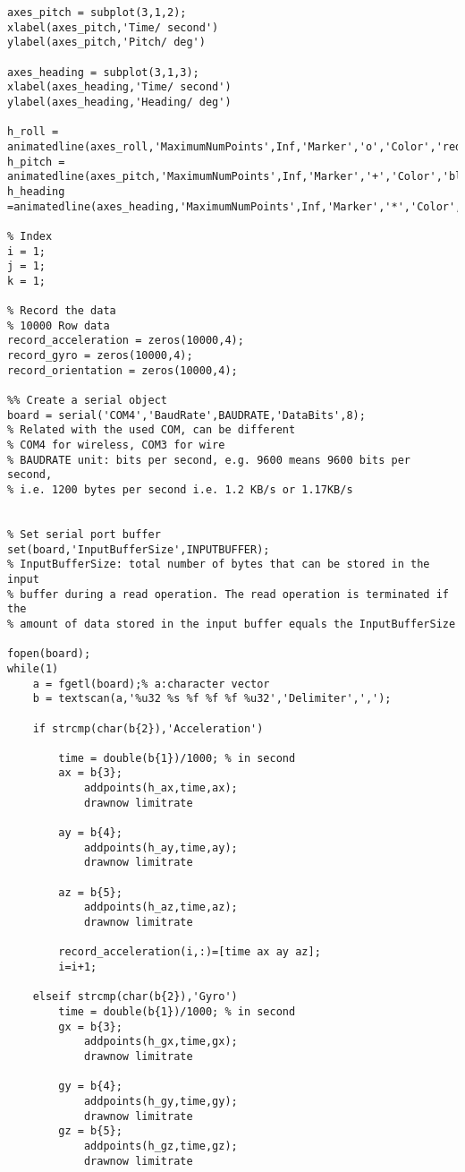 \begin{lstlisting}
axes_pitch = subplot(3,1,2);
xlabel(axes_pitch,'Time/ second')
ylabel(axes_pitch,'Pitch/ deg')

axes_heading = subplot(3,1,3);
xlabel(axes_heading,'Time/ second')
ylabel(axes_heading,'Heading/ deg')

h_roll = animatedline(axes_roll,'MaximumNumPoints',Inf,'Marker','o','Color','red');
h_pitch = animatedline(axes_pitch,'MaximumNumPoints',Inf,'Marker','+','Color','blue');
h_heading =animatedline(axes_heading,'MaximumNumPoints',Inf,'Marker','*','Color','green');

% Index 
i = 1;
j = 1;
k = 1;

% Record the data
% 10000 Row data
record_acceleration = zeros(10000,4);
record_gyro = zeros(10000,4);
record_orientation = zeros(10000,4);

%% Create a serial object
board = serial('COM4','BaudRate',BAUDRATE,'DataBits',8);
% Related with the used COM, can be different 
% COM4 for wireless, COM3 for wire
% BAUDRATE unit: bits per second, e.g. 9600 means 9600 bits per second,
% i.e. 1200 bytes per second i.e. 1.2 KB/s or 1.17KB/s


% Set serial port buffer
set(board,'InputBufferSize',INPUTBUFFER);
% InputBufferSize: total number of bytes that can be stored in the input
% buffer during a read operation. The read operation is terminated if the
% amount of data stored in the input buffer equals the InputBufferSize

fopen(board);
while(1)
    a = fgetl(board);% a:character vector
    b = textscan(a,'%u32 %s %f %f %f %u32','Delimiter',',');
    
    if strcmp(char(b{2}),'Acceleration')
    
        time = double(b{1})/1000; % in second
        ax = b{3}; 
            addpoints(h_ax,time,ax);
            drawnow limitrate
             
        ay = b{4};
            addpoints(h_ay,time,ay);
            drawnow limitrate
            
        az = b{5};
            addpoints(h_az,time,az);
            drawnow limitrate
            
        record_acceleration(i,:)=[time ax ay az];
        i=i+1;
        
    elseif strcmp(char(b{2}),'Gyro')
        time = double(b{1})/1000; % in second
        gx = b{3}; 
            addpoints(h_gx,time,gx);
            drawnow limitrate
            
        gy = b{4};
            addpoints(h_gy,time,gy);
            drawnow limitrate
        gz = b{5};
            addpoints(h_gz,time,gz);
            drawnow limitrate
            

\end{lstlisting}
